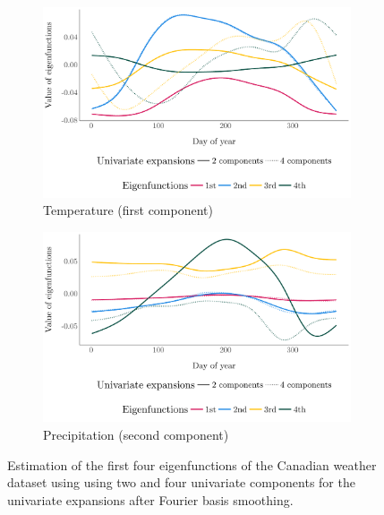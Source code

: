 \documentclass[11pt]{article}
\begin{document}
\begin{figure}[!h]
     \centering
     \begin{subfigure}[b]{0.49\textwidth}
         \centering
         \includegraphics[width=1\textwidth]{temperature_eigen_fourier.pdf}
         \caption{Temperature (first component)}
         \label{fig:temperature}
     \end{subfigure}
     \hfill
     \begin{subfigure}[b]{0.49\textwidth}
         \centering
         \includegraphics[width=1\textwidth]{precipitation_eigen_fourier.pdf}
         \caption{Precipitation (second component)}
         \label{fig:precipitation}
     \end{subfigure}
     \caption{Estimation of the first four eigenfunctions of the Canadian weather dataset using using two and four univariate components for the univariate expansions after Fourier basis smoothing.}
     \label{fig:eigenfunctions_weather}
\end{figure}
\end{document}
